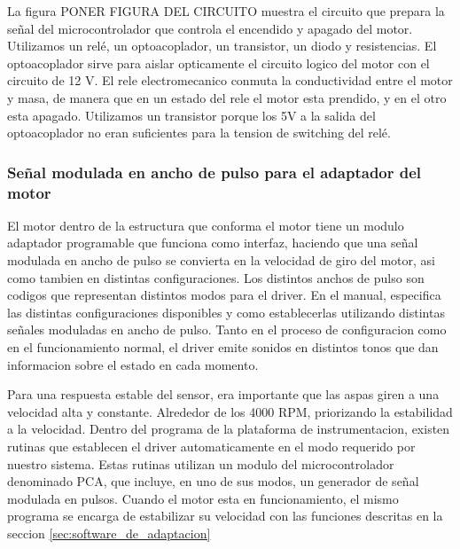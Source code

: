 La figura PONER FIGURA DEL CIRCUITO muestra el circuito que prepara la señal del microcontrolador que controla el encendido y apagado del motor. Utilizamos un relé, un optoacoplador, un transistor, un diodo y resistencias. El optoacoplador sirve para aislar opticamente el circuito logico del motor con el circuito de 12 V. El rele electromecanico conmuta la conductividad entre el motor y masa, de manera que en un estado del rele el motor esta prendido, y en el otro esta apagado. Utilizamos un transistor porque los 5V a la salida del optoacoplador no eran suficientes para la tension de switching del relé.


\subsubsection{Señal modulada en ancho de pulso para el adaptador del motor} %
\label{ssub:señal_modulada_en_ancho_de_pulso_para_el_adaptador_del_motor}


El motor dentro de la estructura que conforma el motor tiene un modulo adaptador programable que funciona como interfaz, haciendo que una señal modulada en ancho de pulso se convierta en la velocidad de giro del motor, asi como tambien en distintas configuraciones. Los distintos anchos de pulso son codigos que representan distintos modos para el driver. En el manual, especifica las distintas configuraciones disponibles y como establecerlas utilizando distintas señales moduladas en ancho de pulso. Tanto en el proceso de configuracion como en el funcionamiento normal, el driver emite sonidos en distintos tonos que dan informacion sobre el estado en cada momento.

Para una respuesta estable del sensor, era importante que las aspas giren a una velocidad alta y constante. Alrededor de los 4000 RPM, priorizando la estabilidad a la velocidad. Dentro del programa de la plataforma de instrumentacion, existen rutinas que establecen el driver automaticamente en el modo requerido por nuestro sistema. Estas rutinas utilizan un modulo del microcontrolador denominado PCA, que incluye, en uno de sus modos, un generador de señal modulada en pulsos. Cuando el motor esta en funcionamiento, el mismo programa se encarga de estabilizar su velocidad con las funciones descritas en la seccion \ref{sec:software_de_adaptacion}


